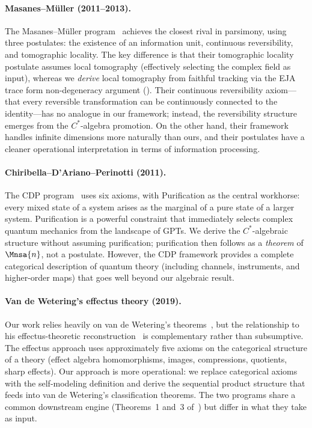 \paragraph{Masanes--M\"uller (2011--2013).}
The Masanes--M\"uller program~\cite{MasanesMueller2011,MasanesMueller2013}
achieves the closest rival in parsimony, using three postulates:
the existence of an information unit, continuous reversibility, and
tomographic locality.  The key difference is that their tomographic
locality postulate assumes local tomography (effectively selecting the
complex field as input), whereas we \emph{derive} local tomography
from faithful tracking via the EJA trace form non-degeneracy argument
().  Their continuous reversibility axiom---that
every reversible transformation can be continuously connected to the
identity---has no analogue in our framework; instead, the
reversibility structure emerges from the $C^{*}$-algebra promotion.
On the other hand, their framework handles infinite dimensions more
naturally than ours, and their postulates have a cleaner operational
interpretation in terms of information processing.

\paragraph{Chiribella--D'Ariano--Perinotti (2011).}
The CDP program~\cite{CDP2011} uses six axioms, with Purification as
the central workhorse: every mixed state of a system arises as the
marginal of a pure state of a larger system.  Purification is a
powerful constraint that immediately selects complex quantum mechanics
from the landscape of GPTs.  We derive the $C^{*}$-algebraic structure
without assuming purification; purification then follows as a
\emph{theorem} of $\Mnsa{n}$, not a postulate.  However, the CDP
framework provides a complete categorical description of quantum
theory (including channels, instruments, and higher-order maps) that
goes well beyond our algebraic result.

\paragraph{Van de Wetering's effectus theory (2019).}
Our work relies heavily on van de Wetering's
theorems~\cite{vandeWetering2019b}, but the relationship to his
effectus-theoretic reconstruction~\cite{vandeWetering2019} is
complementary rather than subsumptive.  The effectus approach uses
approximately five axioms on the categorical structure of a theory
(effect algebra homomorphisms, images, compressions, quotients, sharp
effects).  Our approach is more operational: we replace categorical
axioms with the self-modeling definition and derive the
sequential product structure that feeds into van de Wetering's
classification theorems.  The two programs share a common downstream
engine (Theorems~1 and~3 of~\cite{vandeWetering2019b}) but differ in
what they take as input.

